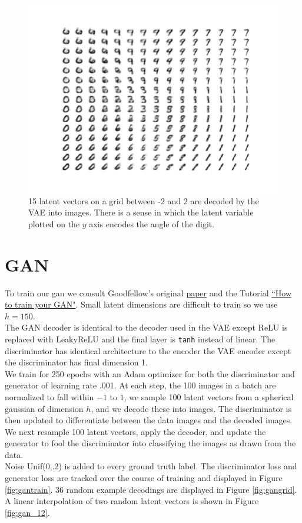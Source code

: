 \documentclass[11pt]{article}
\begin{document}
\begin{figure}
  \centering
  \includegraphics[width=15cm]{imgs/gridvae}
  \caption{\label{fig:grid} 15 latent vectors on a grid between -2 and 2 are decoded by the VAE into images. There is a sense in which the latent variable plotted on the $y$ axis encodes the angle of the digit.}
\end{figure}

\section{GAN}
To train our gan we consult Goodfellow's original \href{https://arxiv.org/pdf/1406.2661.pdf}{paper} and the Tutorial \href{https://github.com/soumith/ganhacks}{``How to train your GAN"}. Small latent dimensions are difficult to train so we use $h=150$.\\
The GAN decoder is identical to the decoder used in the VAE except ReLU is replaced with LeakyReLU and the final layer is \texttt{tanh} instead of linear. The discriminator has identical architecture to the encoder the VAE encoder except the discriminator has final dimension 1.\\
We train for 250 epochs with an Adam optimizer for both the discriminator and generator of learning rate .001. At each step, the 100  images in a batch are normalized to fall within $-1$ to $1$, we sample 100 latent vectors from a spherical gaussian of dimension $h$, and we decode these into images. The discriminator is then updated to differentiate between the data images and the decoded images. We next resample 100 latent vectors, apply the decoder, and update the generator to fool the discriminator into classifying the images as drawn from the data.\\
Noise Unif(0,.2) is added to every ground truth label. The discriminator loss and generator loss are tracked over the course of training and displayed in Figure \ref{fig:gantrain}. 36 random example decodings are displayed in Figure \ref{fig:gangrid}. A linear interpolation of two random latent vectors is shown in Figure \ref{fig:gan_12}.
\end{document}
